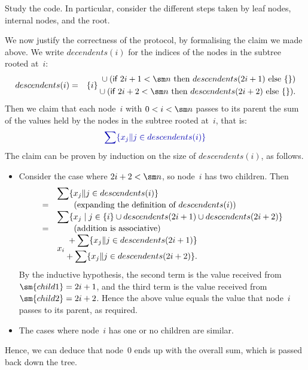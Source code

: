 \begin{instruction}
Study the code.  In particular, consider the different steps taken by leaf
nodes, internal nodes, and the root.
\end{instruction}


We now justify the correctness of the protocol, by formalising the claim we
made above.  We write $decendents(i)$ for the indices of the nodes in the
subtree rooted at~$i$:
%
\begin{eqnarray*}
descendents(i) & = & 
  \set{i} 
    \begin{align}
      \null \union (\If 2i+1 < \sm n \mbox{ then } descendents(2i+1) 
      \mbox{ else } \set{}) \\
      \null \union
      (\If 2i+2 < \sm n  \mbox{ then }  descendents(2i+2) \mbox{ else } \set{}).
    \end{align}
\end{eqnarray*}
%
Then we claim that each node~$i$ with $0 < i < \sm n$ passes to its parent the
sum of the values held by the nodes in the subtree rooted at~$i$, that is:
%
\[\mstyle
\sum \set{x_j \| j \in descendents(i)}
\]
The claim can be proven by induction on the size of $descendents(i)$, as
follows.
%
\begin{itemize}
\item
Consider the case where $2i + 2 < \sm n$, so node~$i$ has two children.  Then
\[
\begin{array}{cl}
& \displaystyle\sum \set{x_j \| j \in descendents(i)}  \\
= & \qquad\mbox{(expanding the definition of $descendents(i)$)} \\

& \displaystyle\sum 
  \set{x_j \mid j \in \set{i} \union  descendents(2i+1) \union
               descendents(2i+2) } \\
= & \qquad\mbox{(addition is associative)} \\ 
& x_i 
  \begin{align}
  \null + \displaystyle \sum \set{x_j \| j \in descendents(2i+1)} \\
  \null + \displaystyle \sum \set{x_j \| j \in descendents(2i+2)}.
  \end{align}
\end{array}
\]
By the inductive hypothesis, the second term is the value received from
$\sm{child1} = 2i+1$, and the third term is the value received from
$\sm{child2} = 2i+2$.  Hence the above value equals the value that node~$i$
passes to its parent, as required.

\item
The cases where node~$i$ has one or no children are similar.
\end{itemize}
%
Hence, we can deduce that node~$0$ ends up with the overall sum, which is
passed back down the tree.

